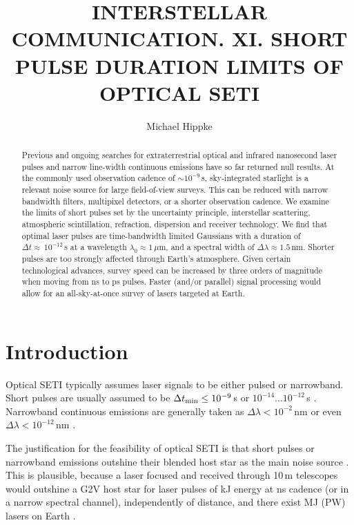 \documentclass[twocolumn,tighten,longauthor]{myaastex62}
\begin{document}
\title{INTERSTELLAR COMMUNICATION. XI. SHORT PULSE DURATION LIMITS OF OPTICAL SETI}
\author[0000-0002-0794-6339]{Michael Hippke}


\begin{abstract}
Previous and ongoing searches for extraterrestrial optical and infrared nanosecond laser pulses and narrow line-width continuous emissions have so far returned null results. At the commonly used observation cadence of $\sim 10^{-9}\,$s, sky-integrated starlight is a relevant noise source for large field-of-view surveys. This can be reduced with narrow bandwidth filters, multipixel detectors, or a shorter observation cadence. We examine the limits of short pulses set by the uncertainty principle, interstellar scattering, atmospheric scintillation, refraction, dispersion and receiver technology. We find that optimal laser pulses are time-bandwidth limited Gaussians with a duration of $\Delta t \approx\,10^{-12}$\,s at a wavelength $\lambda_{0}\approx1\,\mu$m, and a spectral width of $\Delta \lambda \approx 1.5\,$nm. Shorter pulses are too strongly affected through Earth's atmosphere. Given certain technological advances, survey speed can be increased by three orders of magnitude when moving from ns to ps pulses. Faster (and/or parallel) signal processing would allow for an all-sky-at-once survey of lasers targeted at Earth.\\
\end{abstract}


\section{Introduction}
Optical SETI typically assumes laser signals to be either pulsed or narrowband. Short pulses are usually assumed to be $\Delta t_{\rm min} \leq 10^{-9}\,$s \citep{Howard2001} or $10^{-14} \dots 10^{-12}\,$s \citep{2016SPIE.9908E..10M}. Narrowband continuous emissions are generally taken as $\Delta \lambda < 10^{-2} \,$nm \citep[e.g.,][]{2017AJ....153..251T} or even $\Delta \lambda < 10^{-12} \,$nm \citep[$<\,$Hz,][]{1993SPIE.1867...75K}.

The justification for the feasibility of optical SETI is that short pulses or narrowband emissions outshine their blended host star as the main noise source \citep[e.g.,][]{2004ApJ...613.1270H}. This is plausible, because a laser focused and received through 10\,m telescopes would outshine a G2V host star for laser pulses of kJ energy at ns cadence (or in a narrow spectral channel), independently of distance, and there exist MJ (PW) lasers on Earth \citep{2017ApPhB.123...42H}.
\end{document}
